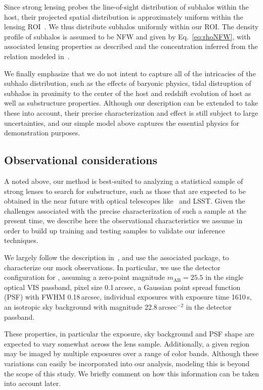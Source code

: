 \documentclass[twocolumn]{aastex62}
\begin{document}
Since strong lensing probes the line-of-sight distribution of subhalos within the host, their projected spatial distribution is approximately uniform within the lensing ROI~\citep{2017MNRAS.469.1997D}. We thus distribute subhalos uniformly within our ROI. The density profile of subhalos is assumed to be NFW and given by Eq.~\ref{eq:rhoNFW}, with associated lensing properties as described and the concentration inferred from the relation modeled in~\citet{2014MNRAS.442.2271S}.

We finally emphasize that we do not intent to capture all of the intricacies of the subhalo distribution, such as the effects of baryonic physics, tidal distruption of subhalos in proximity to the center of the host and redshift evolution of host as well as substructure properties. Although our description can be extended to take these into account, their precise characterization and effect is still subject to large uncertainties, and our simple model above captures the essential physics for demonstration purposes.

\subsection{Observational considerations}
\label{sec:observations}

A noted above, our method is best-suited to analyzing a statistical sample of strong lenses to search for substructure, such as those that are expected to be obtained in the near future with optical telescopes like \Euclid~and LSST. Given the challenges associated with the precise characterization of such a sample at the present time, we describe here the observational characteristics we assume in order to build up training and testing samples to validate our inference techniques.

We largely follow the description in~\citet{2015ApJ...811...20C}, and use the associated  package, to characterize our mock observations. In particular, we use the detector configuration for \Euclid, assuming a zero-point magnitude $m_\mathrm{AB} = 25.5$ in the single optical VIS passband, pixel size 0.1\,arcsec, a Gaussian point spread function (PSF) with FWHM 0.18\,arcsec, individual exposures with exposure time 1610\,s, an isotropic sky background with magnitude 22.8\,arcsec$^{-2}$ in the detector passband.

These properties, in particular the exposure, sky background and PSF shape are expected to vary somewhat across the lens sample. Additionally, a given region may be imaged by multiple exposures over a range of color bands. Although these variations can easily be incorporated into our analysis, modeling this is beyond the scope of this study. We briefly comment on how this information can be taken into account later.
\end{document}
